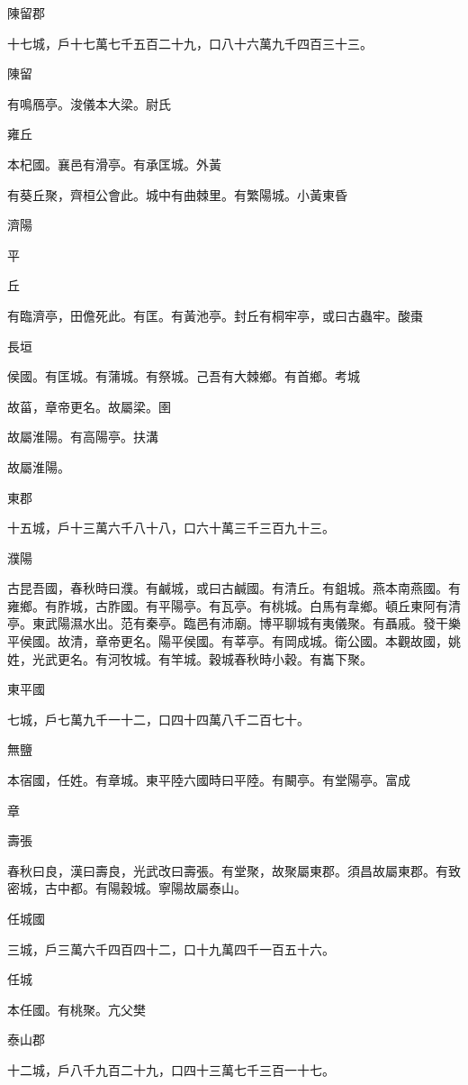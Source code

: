 
\begin{pinyinscope}
陳留郡

十七城，戶十七萬七千五百二十九，口八十六萬九千四百三十三。

陳留

有鳴鴈亭。浚儀本大梁。尉氏

雍丘

本杞國。襄邑有滑亭。有承匡城。外黃

有葵丘聚，齊桓公會此。城中有曲棘里。有繁陽城。小黃東昏

濟陽

平

丘

有臨濟亭，田儋死此。有匡。有黃池亭。封丘有桐牢亭，或曰古蟲牢。酸棗

長垣

侯國。有匡城。有蒲城。有祭城。己吾有大棘鄉。有首鄉。考城

故菑，章帝更名。故屬梁。圉

故屬淮陽。有高陽亭。扶溝

故屬淮陽。

東郡

十五城，戶十三萬六千八十八，口六十萬三千三百九十三。

濮陽

古昆吾國，春秋時曰濮。有鹹城，或曰古鹹國。有清丘。有鉏城。燕本南燕國。有雍鄉。有胙城，古胙國。有平陽亭。有瓦亭。有桃城。白馬有韋鄉。頓丘東阿有清亭。東武陽濕水出。范有秦亭。臨邑有沛廟。博平聊城有夷儀聚。有聶戚。發干樂平侯國。故清，章帝更名。陽平侯國。有莘亭。有岡成城。衛公國。本觀故國，姚姓，光武更名。有河牧城。有竿城。穀城春秋時小穀。有巂下聚。

東平國

七城，戶七萬九千一十二，口四十四萬八千二百七十。

無鹽

本宿國，任姓。有章城。東平陸六國時曰平陸。有闞亭。有堂陽亭。富成

章

壽張

春秋曰良，漢曰壽良，光武改曰壽張。有堂聚，故聚屬東郡。須昌故屬東郡。有致密城，古中都。有陽穀城。寧陽故屬泰山。

任城國

三城，戶三萬六千四百四十二，口十九萬四千一百五十六。

任城

本任國。有桃聚。亢父樊

泰山郡

十二城，戶八千九百二十九，口四十三萬七千三百一十七。


\end{pinyinscope}
